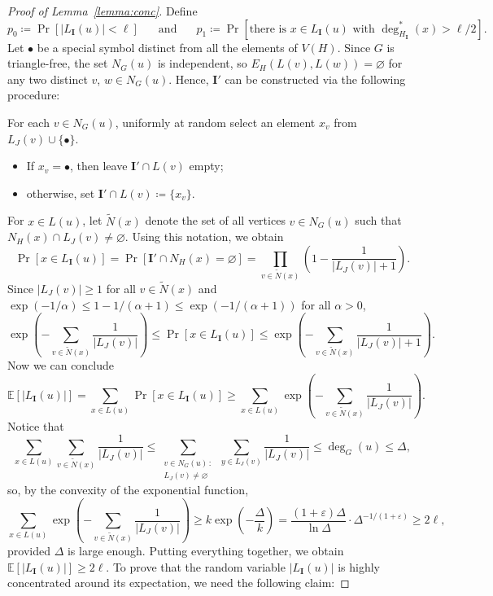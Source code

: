 \documentclass[11pt, reqno, psamsfonts]{amsart}
\theoremstyle{definition}
\theoremstyle{remark}
\newcommand{\0}{\varnothing}
\newcommand{\set}[1]{\{#1\}}
\renewcommand{\epsilon}{\varepsilon}
\renewcommand{\tilde}{\widetilde}
\renewcommand{\leq}{\leqslant}
\renewcommand{\geq}{\geqslant}
\newcommand{\defeq}{\coloneqq}
\renewcommand{\mathbf}[1]{{\bm{#1}}}
\numberwithin{equation}{section}
\begin{document}
	\begin{proof}[Proof of Lemma~\ref{lemma:conc}]
	
	Define
	\[
	p_0 \defeq \Pr\left[|L_{\mathbf{I}}(u)| < \ell\right]\;\;\;\;\; \text{ and }\;\;\;\;\;
	p_1 \defeq \Pr\left[\text{there is } x \in L_\mathbf{I}(u) \text{ with } \deg^\ast_{H_{\mathbf{I}}}(x) > \ell/2\right].
	\]
	Let $\bullet$ be a special symbol distinct from all the elements of $V(H)$. Since $G$ is triangle-free, the set $N_G(u)$ is independent, so $E_H(L(v), L(w)) = \0$ for any two distinct $v$, $w \in N_G(u)$. Hence, $\mathbf{I}'$ can be constructed via the following procedure:
	\begin{samepage}
	\begin{leftbar}
		\noindent For each $v \in N_G(u)$, uniformly at random select an element $x_v$ from $L_J(v) \cup \set{\bullet}$.
		\begin{itemize}[label=--]
			\item If $x_v = \bullet$, then leave $\mathbf{I}'\cap L(v)$ empty;
			\item otherwise, set $\mathbf{I}'\cap L(v) \defeq \set{x_v}$.
		\end{itemize}
	\end{leftbar}
	\end{samepage}
	
	For $x \in L(u)$, let $\tilde{N}(x)$ denote the set of all vertices $v \in N_G(u)$ such that $N_H(x) \cap L_J(v) \neq \0$. Using this notation, we obtain
	\[
	\Pr\left[x \in L_\mathbf{I}(u)\right] = \Pr\left[\mathbf{I}' \cap N_H(x) = \0\right] = \prod_{v \in \tilde{N}(x)}  \left(1 - \frac{1}{ |L_J(v)| + 1}\right).
	\]
	Since $|L_J(v)| \geq 1$ for all $v \in \tilde{N}(x)$ and $\exp(-1/\alpha) \leq 1 - 1/(\alpha+1) \leq \exp(-1/(\alpha+1))$ for all $\alpha > 0$,
	\begin{equation}\label{eq:bounds_on_p}
	\exp\left(-\sum_{v \in \tilde{N}(x)}\frac{1}{|L_J(v)|}\right)\leq \Pr\left[x \in L_\mathbf{I}(u)\right] \leq \exp\left(-\sum_{v \in \tilde{N}(x)}\frac{1}{|L_J(v)|+1}\right).
	\end{equation}
	Now we can conclude
	\[
	\mathbb{E}\left[|L_\mathbf{I}(u)|\right] = \sum_{x \in L(u)} \Pr\left[x \in L_\mathbf{I}(u)\right] \geq \sum_{x \in L(u)} \exp\left(-\sum_{v \in \tilde{N}(x)}\frac{1}{|L_J(v)|}\right).
	\]
	Notice that
	\[
	\sum_{x \in L(u)} \sum_{v \in \tilde{N}(x)}\frac{1}{|L_J(v)|} \leq \sum_{\substack{v \in N_G(u)\,:\\ L_J(v) \neq \0}} \, \sum_{y \in L_J(v)} \frac{1}{|L_J(v)|} \leq \deg_G(u) \leq \Delta,
	\]
	so, by the convexity of the exponential function,
	\[
		\sum_{x \in L(u)} \exp\left(-\sum_{v \in \tilde{N}(x)}\frac{1}{|L_J(v)|}\right) \geq k \exp\left(-\frac{\Delta}{k}\right) = \frac{(1+\epsilon)\Delta}{\ln\Delta} \cdot \Delta^{-1/(1+\epsilon)} \geq 2\ell,
	\]
	provided $\Delta$ is large enough. Putting everything together, we obtain $\mathbb{E}\left[|L_\mathbf{I}(u)|\right] \geq 2\ell$. To prove that the random variable $|L_\mathbf{I}(u)|$ is highly concentrated around its expectation, we need the following claim:
	

\end{proof}
\end{document}
